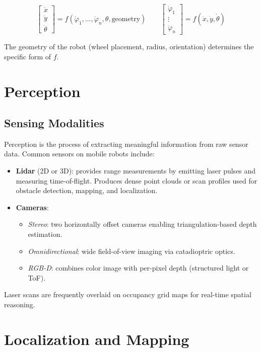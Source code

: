 \documentclass[11pt,a4paper]{article}
\theoremstyle{definition}
\theoremstyle{plain}
\theoremstyle{remark}
\begin{document}
\[
\begin{bmatrix} \dot{x} \\ \dot{y} \\ \dot{\theta} \end{bmatrix}
= f(\dot{\varphi}_1, \ldots, \dot{\varphi}_n, \theta, \text{geometry})
\qquad
\begin{bmatrix} \dot{\varphi}_1 \\ \vdots \\ \dot{\varphi}_n \end{bmatrix}
= f(\dot{x}, \dot{y}, \dot{\theta})
\]

The geometry of the robot (wheel placement, radius, orientation) determines the specific form of $f$.

\section{Perception}

\subsection{Sensing Modalities}

Perception is the process of extracting meaningful information from raw sensor data. Common sensors on mobile robots include:

\begin{itemize}
    \item \textbf{Lidar} (2D or 3D): provides range measurements by emitting laser pulses and measuring time-of-flight. Produces dense point clouds or scan profiles used for obstacle detection, mapping, and localization.
    \item \textbf{Cameras}:
    \begin{itemize}
        \item \textit{Stereo}: two horizontally offset cameras enabling triangulation-based depth estimation.
        \item \textit{Omnidirectional}: wide field-of-view imaging via catadioptric optics.
        \item \textit{RGB-D}: combines color image with per-pixel depth (structured light or ToF).
    \end{itemize}
\end{itemize}

Laser scans are frequently overlaid on occupancy grid maps for real-time spatial reasoning.

\section{Localization and Mapping}
\end{document}
